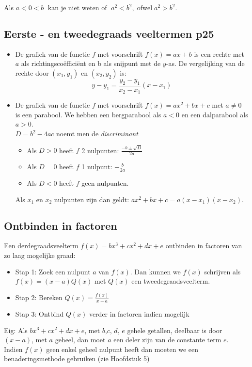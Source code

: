 \documentclass[11pt]{article}
\newcommand{\ds}{\displaystyle}
\begin{document}
{Als $a<0<b \;\mbox{ kan je niet weten of }\;a^2<b^2,\; \mbox{ofwel}
\;a^2>b^2$.


\subsection{Eerste - en tweedegraads veeltermen p25}
\begin{itemize}
\item De grafiek van de functie $f$ met voorschrift $ f(x)= ax+b$ is een rechte met $a$ als richtingsco\"effici\"ent en b als snijpunt met de $y$-as.
De vergelijking van de rechte door $(x_1,y_1)$ en $(x_2,y_2)$ is:
$$y-y_1 = \frac{y_2-y_1}{x_2-x_1} (x-x_1)$$
\item
De grafiek van de functie $f$ met voorschrift $ f(x)= ax^2+bx+c$ met
 $a\neq 0$ is een parabool.
We hebben een bergparabool als $a<0$ en een dalparabool als $a>0$.
\\$D=b^2-4ac$ noemt men de \emph{discriminant}
\begin{itemize}
\item Als $D > 0$ heeft $f$ 2 nulpunten:
$\displaystyle{\frac{-b\pm \sqrt{D}}{2a}}$
\item Als $D = 0$ heeft $f$ 1 nulpunt: $\displaystyle{-\frac{b}{2a}}$
\item Als $D<0$ heeft $f$ geen nulpunten.
\end{itemize}
Als $x_1$ en $x_2$ nulpunten zijn dan geldt: $ax^2+bx+c = a
(x-x_1)(x-x_2)$.
\end{itemize}

\subsection{Ontbinden in factoren}
Een derdegraadsveelterm $f(x) = b x^3+ c x^2+ d x+ e$ ontbinden in
factoren van zo laag mogelijke graad: \begin{itemize} \item Stap 1:
Zoek een nulpunt $a$ van $f(x)$. Dan kunnen we $f(x)$ schrijven als
$f(x) = (x-a) Q(x)$ met $Q(x)$ een tweedegraadsveelterm.
\item Stap 2: Bereken $\ds Q(x) = \frac{f(x)}{x-a}$
\item Stap 3: Ontbind $Q(x)$ verder in factoren indien mogelijk
\end{itemize}
Eig:  Als $b x^3+ c x^2+ d x+ e$, met $b$,$c$, $d$, $e$ gehele
getallen, deelbaar is door $(x-a)$, met $a$ geheel, dan moet $a$ een
deler zijn van de constante term $e$. Indien $f(x)$ geen enkel
geheel nulpunt heeft dan moeten we een benaderingsmethode gebruiken
(zie Hoofdstuk 5)


}
\end{document}
